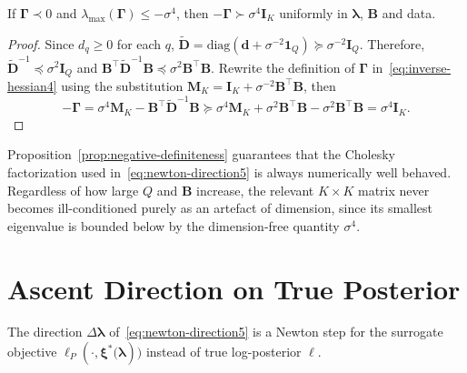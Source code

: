 \begin{proposition}
    If $\bm{\Gamma}\prec 0$ and $\lambda_{\text{max}}(\bm{\Gamma})\leq -\sigma^{4}$, then $-\bm{\Gamma}\succ \sigma^{4}\mathbf{I}_{K}$ uniformly in $\bm{\lambda}$, $\mathbf{B}$ and data.
    \label{prop:negative-definiteness}
\end{proposition}

\begin{proof}
    Since $d_{q}\geq 0$ for each $q$, $\tilde{\mathbf{D}}=\text{diag}(\mathbf{d}+\sigma^{-2}\mathbf{1}_{Q})\succeq \sigma^{-2}\mathbf{I}_{Q}$. Therefore, $\tilde{\mathbf{D}}^{-1}\preceq \sigma^{2}\mathbf{I}_{Q}$ and $\mathbf{B}^{\top}\tilde{\mathbf{D}}^{-1}\mathbf{B}\preceq \sigma^{2}\mathbf{B}^{\top}\mathbf{B}$.
    Rewrite the definition of $\bm{\Gamma}$ in~\eqref{eq:inverse-hessian4} using the substitution $\mathbf{M}_{K}=\mathbf{I}_{K}+\sigma^{-2}\mathbf{B}^{\top}\mathbf{B}$, then
    \[
        -\bm{\Gamma}=\sigma^{4}\mathbf{M}_{K}-\mathbf{B}^{\top}\tilde{\mathbf{D}}^{-1}\mathbf{B}\succeq \sigma^{4}\mathbf{M}_{K}+\sigma^{2}\mathbf{B}^{\top}\mathbf{B}-\sigma^{2}\mathbf{B}^{\top}\mathbf{B}=\sigma^{4}\mathbf{I}_{K}.
    \]
\end{proof}

Proposition~\ref{prop:negative-definiteness} guarantees that the Cholesky factorization used in~\eqref{eq:newton-direction5} is always numerically well behaved. Regardless of how large $Q$ and $\mathbf{B}$ increase, the relevant $K\times K$ matrix never becomes ill-conditioned purely as an artefact of dimension, since its smallest eigenvalue is bounded below by the dimension-free quantity $\sigma^{4}$.

\section{Ascent Direction on True Posterior}
\label{sec:ascent-direction-on-true-posterior}

The direction $\Delta \bm{\lambda}$ of~\eqref{eq:newton-direction5} is a Newton step for the surrogate objective $\ell_{P}(\cdot, \bm{\xi}^{*}\bigl(\bm{\lambda})\bigr)$ instead of true log-posterior $\ell$.

